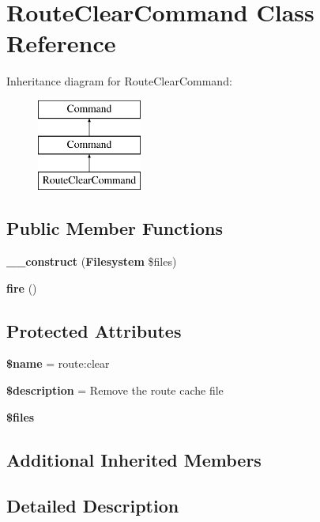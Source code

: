 \section{Route\+Clear\+Command Class Reference}
\label{class_illuminate_1_1_foundation_1_1_console_1_1_route_clear_command}
Inheritance diagram for Route\+Clear\+Command\+:\begin{figure}[H]
\begin{center}
\leavevmode
\includegraphics[height=3.000000cm]{class_illuminate_1_1_foundation_1_1_console_1_1_route_clear_command}
\end{center}
\end{figure}
\subsection*{Public Member Functions}
\begin{DoxyCompactItemize}
\item 
{\bf \+\_\+\+\_\+construct} ({\bf Filesystem} \$files)
\item 
{\bf fire} ()
\end{DoxyCompactItemize}
\subsection*{Protected Attributes}
\begin{DoxyCompactItemize}
\item 
{\bf \$name} = \textquotesingle{}route\+:clear\textquotesingle{}
\item 
{\bf \$description} = \textquotesingle{}Remove the route cache file\textquotesingle{}
\item 
{\bf \$files}
\end{DoxyCompactItemize}
\subsection*{Additional Inherited Members}


\subsection{Detailed Description}


